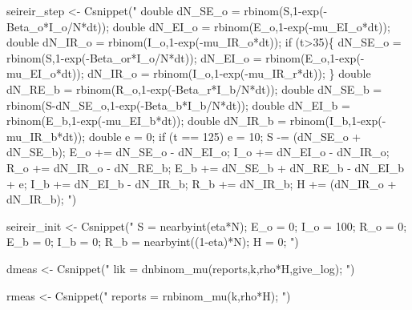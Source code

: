 \documentclass[
]{article}
\newenvironment{Shaded}{\begin{snugshade}}{\end{snugshade}}
\newcommand{\FunctionTok}[1]{\textcolor[rgb]{0.00,0.00,0.00}{#1}}
\newcommand{\NormalTok}[1]{#1}
\newcommand{\OtherTok}[1]{\textcolor[rgb]{0.56,0.35,0.01}{#1}}
\newcommand{\StringTok}[1]{\textcolor[rgb]{0.31,0.60,0.02}{#1}}
\begin{document}
\begin{Shaded}
\begin{Highlighting}[]
\NormalTok{seireir\_step }\OtherTok{\textless{}{-}} \FunctionTok{Csnippet}\NormalTok{(}\StringTok{"}
\StringTok{  double dN\_SE\_o = rbinom(S,1{-}exp({-}Beta\_o*I\_o/N*dt));}
\StringTok{  double dN\_EI\_o = rbinom(E\_o,1{-}exp({-}mu\_EI\_o*dt));}
\StringTok{  double dN\_IR\_o = rbinom(I\_o,1{-}exp({-}mu\_IR\_o*dt));}
\StringTok{  }
\StringTok{  if (t\textgreater{}35)\{}
\StringTok{    dN\_SE\_o = rbinom(S,1{-}exp({-}Beta\_or*I\_o/N*dt));}
\StringTok{    dN\_EI\_o = rbinom(E\_o,1{-}exp({-}mu\_EI\_o*dt));}
\StringTok{    dN\_IR\_o = rbinom(I\_o,1{-}exp({-}mu\_IR\_r*dt));}
\StringTok{  \}}
\StringTok{  double dN\_RE\_b = rbinom(R\_o,1{-}exp({-}Beta\_r*I\_b/N*dt));}
\StringTok{  double dN\_SE\_b = rbinom(S{-}dN\_SE\_o,1{-}exp({-}Beta\_b*I\_b/N*dt));}
\StringTok{  double dN\_EI\_b = rbinom(E\_b,1{-}exp({-}mu\_EI\_b*dt));}
\StringTok{  double dN\_IR\_b = rbinom(I\_b,1{-}exp({-}mu\_IR\_b*dt));}
\StringTok{  double e = 0;}
\StringTok{  if (t == 125) e = 10;}
\StringTok{  S {-}= (dN\_SE\_o + dN\_SE\_b);}
\StringTok{  E\_o += dN\_SE\_o {-} dN\_EI\_o;}
\StringTok{  I\_o += dN\_EI\_o {-} dN\_IR\_o;}
\StringTok{  R\_o += dN\_IR\_o {-} dN\_RE\_b;}
\StringTok{  E\_b += dN\_SE\_b + dN\_RE\_b {-} dN\_EI\_b + e;}
\StringTok{  I\_b += dN\_EI\_b {-} dN\_IR\_b;}
\StringTok{  R\_b += dN\_IR\_b;}
\StringTok{  H += (dN\_IR\_o + dN\_IR\_b);}
\StringTok{"}\NormalTok{)}

\NormalTok{seireir\_init }\OtherTok{\textless{}{-}} \FunctionTok{Csnippet}\NormalTok{(}\StringTok{"}
\StringTok{  S = nearbyint(eta*N);}
\StringTok{  E\_o = 0;}
\StringTok{  I\_o = 100;}
\StringTok{  R\_o = 0;}
\StringTok{  E\_b = 0;}
\StringTok{  I\_b = 0;}
\StringTok{  R\_b = nearbyint((1{-}eta)*N);}
\StringTok{  H = 0;}
\StringTok{"}\NormalTok{)}

\NormalTok{dmeas }\OtherTok{\textless{}{-}} \FunctionTok{Csnippet}\NormalTok{(}\StringTok{"}
\StringTok{  lik = dnbinom\_mu(reports,k,rho*H,give\_log);}
\StringTok{   }
\StringTok{  "}\NormalTok{)}

\NormalTok{rmeas }\OtherTok{\textless{}{-}} \FunctionTok{Csnippet}\NormalTok{(}\StringTok{"}
\StringTok{  reports = rnbinom\_mu(k,rho*H);}
\StringTok{  "}\NormalTok{)}


\end{Highlighting}
\end{Shaded}
\end{document}
